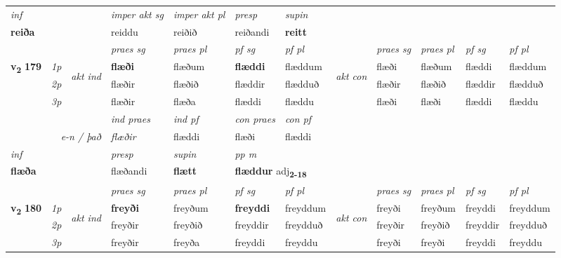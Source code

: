 \begin{longtable}[l]{X>{\footnotesize\itshape}llXXXXlXXXX}
\cmidrule{4-7}
   {\textit{inf}} & &  & \textit{imper akt sg} & \textit{imper akt pl}   & \textit{presp} & \textit{supin}   \\*
  {\textbf{reiða}} & && reiddu  & reiðið   & reiðandi &  \textbf{reitt}   \\*

\midrule

 & &   & \textit{praes sg}  & \textit{praes pl}    & \textit{ pf sg} & \textit{pf pl} & & \textit{praes sg}  & \textit{praes pl}    & \textit{pf sg} & \textit{pf pl }  \\ \cmidrule{4-7} \cmidrule{9-12}
 \multirow{2}{*}{{{\textbf{v{\textsubscript{2}}} \Large{\textbf{179}}}}}  & 1p & \multirow{3}{*}{\begin{turn}{90}\textit{akt ind}\end{turn}} & \textbf{flæði} & flæðum & \textbf{flæddi} & flæddum & \multirow{3}{*}{\begin{turn}{90}\textit{akt con}\end{turn}} &flæði & flæðum & flæddi & flæddum\\*
 & 2p &  &  flæðir  & flæðið & flæddir & flædduð & & flæðir & flæðið & flæddir & flædduð \\*
 & 3p &  & flæðir & flæða & flæddi & flæddu & & flæði & flæði& flæddi & flæddu \\*
\cmidrule{4-7} \cmidrule{9-12}

   && &  \textit{ind praes} & \textit{ind pf} & \textit{con praes} & \textit{con pf} \\*
\multicolumn{3}{r}{\textit{e-n / það}} & flæðir & flæddi & flæði & flæddi \\*

\cmidrule{4-7}
   {\textit{inf}} & &     & \textit{presp} & \textit{supin}  & \textit{pp m} \\*
  {\textbf{flæða}} & &     & flæðandi &  \textbf{flætt}  & \multicolumn{2}{l}{\textbf{flæddur} adj\textbf{\textsubscript{2-18}}} \\*

\midrule

 & &   & \textit{praes sg}  & \textit{praes pl}    & \textit{ pf sg} & \textit{pf pl} & & \textit{praes sg}  & \textit{praes pl}    & \textit{pf sg} & \textit{pf pl }  \\ \cmidrule{4-7} \cmidrule{9-12}
 \multirow{2}{*}{{{\textbf{v{\textsubscript{2}}} \Large{\textbf{180}}}}}  & 1p & \multirow{3}{*}{\begin{turn}{90}\textit{akt ind}\end{turn}} & \textbf{freyði} & freyðum & \textbf{freyddi} & freyddum & \multirow{3}{*}{\begin{turn}{90}\textit{akt con}\end{turn}} &freyði & freyðum & freyddi & freyddum\\*
 & 2p &  &  freyðir  & freyðið & freyddir & freydduð & & freyðir & freyðið & freyddir & freydduð \\*
 & 3p &  & freyðir & freyða & freyddi & freyddu & & freyði & freyði& freyddi & freyddu \\*
\cmidrule{4-7} \cmidrule{9-12}


\end{longtable}
